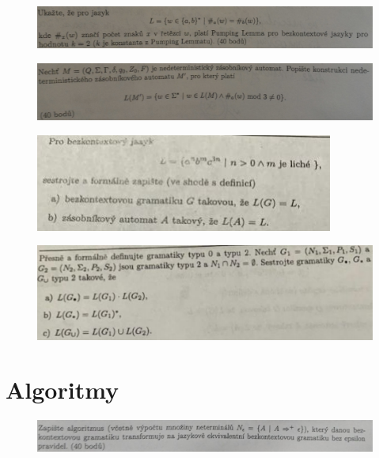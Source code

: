 \documentclass[]{article}
\begin{document}
	\begin{figure}[H]
		\includegraphics[width=\textwidth]{tasks/bezkontextove/task11.png}
	\end{figure}
	
	\begin{figure}[H]
		\includegraphics[width=\textwidth]{tasks/bezkontextove/task12.png}
	\end{figure}
	
	\begin{figure}[H]
		\includegraphics[width=\textwidth]{tasks/bezkontextove/task13.png}
	\end{figure}
	
	\begin{figure}[H]
		\includegraphics[width=\textwidth]{tasks/bezkontextove/task14.png}
	\end{figure}

	\section{Algoritmy}
	
	\begin{figure}[H]
		\includegraphics[width=\textwidth]{tasks/algoritmy/task1.png}
	\end{figure}
	
\end{document}
